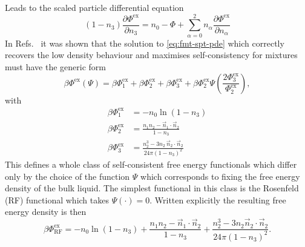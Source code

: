 Leads to the scaled particle%
differential equation
\begin{equation}\label{eq:fmt-spt-pde}
  (1 - n_3) \frac{\partial \Phi^\mathrm{ex}}{\partial n_3}
  =
  n_0 - \Phi
  + \sum_{\alpha = 0}^2
  n_\alpha \frac{\partial \Phi^\mathrm{ex}}{\partial n_\alpha}
\end{equation}
In Refs.\ \cite{SantosJCP2012,SantosPRE2012} it was shown that the solution to \eqref{eq:fmt-spt-pde} which correctly recovers the low density behaviour and maximises self-consistency for mixtures must have the generic form
\begin{equation}
  \beta \Phi^\mathrm{ex}(\Psi)
  =
  \beta \Phi^\mathrm{ex}_1 + \beta \Phi^\mathrm{ex}_2 + \beta \Phi^\mathrm{ex}_3
  + \beta \Phi^\mathrm{ex}_2 \Psi\left(\frac{2 \Phi^\mathrm{ex}_3}{\Phi^\mathrm{ex}_2}\right),
\end{equation}
with
\begin{subequations}
  \begin{align}
    \beta \Phi^\mathrm{ex}_1
    &=
    - n_0 \ln{(1 - n_3)}
    \\
    \beta \Phi^\mathrm{ex}_2
    &=
    \frac{n_1 n_2 - \vec{n}_1 \cdot \vec{n}_2}{1 - n_3}
    \\
    \beta \Phi^\mathrm{ex}_3
    &=
    \frac{n_2^3 - 3 n_2 \, \vec{n}_2 \cdot \vec{n}_2}{24 \pi (1 - n_3)^2}
  \end{align}
\end{subequations}
This defines a whole class of self-consistent free energy functionals which differ only by the choice of the function $\Psi$ which corresponds to fixing the free energy density of the bulk liquid.
The simplest functional in this class is the Rosenfeld (RF) functional which takes $\Psi(\cdot) = 0$.
Written explicitly the resulting free energy density is then \cite{RosenfeldPRL1989}
\begin{equation}\label{eq:rosenfeld-functional}
  \beta \Phi_\mathrm{RF}^\mathrm{ex}
  =
  - n_0 \ln{(1 - n_3)}
  + \frac{n_1 n_2 - \vec{n}_1 \cdot \vec{n}_2}{1 - n_3}
  + \frac{n_2^3 - 3 n_2 \vec{n}_2 \cdot \vec{n}_2}{24 \pi (1 - n_3)^2}.
\end{equation}

